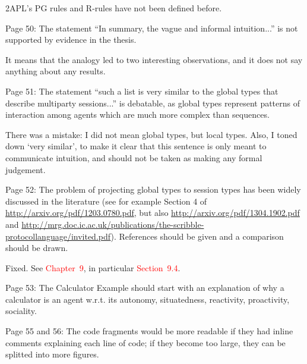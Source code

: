 \documentclass{article}
\newcommand*\R[1]{\textcolor{red}{#1}} %
\newcommand{\todo}[1]{[\textcolor{green}{TODO}: #1]}
\newenvironment{them}{\noindent\begingroup\color{blue}}{\endgroup\par}
\begin{document}
\begin{them}

2APL's PG rules and R-rules have not been defined before.
\end{them}
\todo{define 2APL`s rules}

\begin{them}

Page 50:
The statement “In summary, the vague and informal intuition...” is not
supported by evidence in the thesis.

\end{them}
It means that the analogy led to two interesting observations, and it does not
say anything about any results.

\begin{them}

Page 51:
The statement “such a list is very similar to the global types that describe
multiparty sessions...” is debatable, as global types represent patterns of
interaction among agents which are much more complex than sequences.

\end{them}

There was a mistake: I did not mean global types, but local types.
Also, I toned down `very similar',
  to make it clear that this sentence is only meant to communicate intuition,
and should not be taken as making any formal judgement.


\begin{them}

Page 52:
The problem of projecting global types to session types has been widely
discussed in the literature (see for example Section 4 of
\url{http://arxiv.org/pdf/1203.0780.pdf}, but also
\url{http://arxiv.org/pdf/1304.1902.pdf} and
\url{http://mrg.doc.ic.ac.uk/publications/the-scribble-protocollanguage/invited.pdf}).
References should be given and a comparison should be drawn.

\end{them}

Fixed.
See \R{Chapter~9},
  in particular \R{Section~9.4}.

\begin{them}

Page 53:
The Calculator Example should start with an explanation of why a calculator is
an agent w.r.t. its autonomy, situatedness, reactivity, proactivity, sociality.

\end{them}
\todo{}

\begin{them}

Page 55 and 56:
The code fragments would be more readable if they had inline comments
explaining each line of code; if they become too large, they can be splitted
into more figures.

\end{them}
\todo{}
\end{document}
